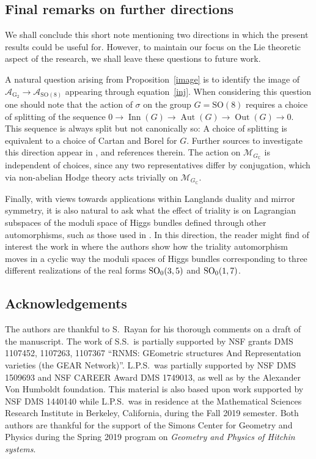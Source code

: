 \documentclass[pdftex]{sigma}
\numberwithin{equation}{section}
\newcommand{\SO}{{\mathrm{SO}}}
\begin{document}
\subsection{Final remarks on further directions}\label{sec:final}
We shall conclude this short note mentioning two directions in which the present results could be useful for. However, to maintain our focus on the Lie theoretic aspect of the research, we shall leave these questions to future work.

 A natural question arising from Proposition~\ref{image} is to identify the image of $\mathcal{A}_{\mathrm{G}_2} \rightarrow \mathcal{A}_{\SO(8)}$ appearing through equation~\eqref{inj}.
When considering this question one should note that the action of $\sigma$ on the group $G=\SO(8)$ requires a choice of splitting of the sequence $0 \rightarrow \operatorname{Inn}(G) \rightarrow \operatorname{Aut}(G) \rightarrow \operatorname{Out}(G) \rightarrow 0$.
 This sequence is always split but not canonically so: A choice of splitting is equivalent to a choice of Cartan and Borel for $G$. Further sources to investigate this direction appear in \cite{anton, oscar}, and references therein. The action on $\mathcal{M}_{G_\mathbb{C}}$ is independent of choices, since any two representatives differ by conjugation, which via non-abelian Hodge theory acts trivially on $\mathcal{M}_{G_\mathbb{C}}$.

 Finally, with views towards applications within Langlands duality and mirror symmetry, it is also natural to ask what the effect of triality is on Lagrangian subspaces of the moduli space of Higgs bundles defined through other automorphisms, such as those used in \cite{slices,cmc}.
In this direction, the reader might find of interest the work in \cite[Section~10]{oscar} where the authors show how the triality automorphism moves in a cyclic way the moduli spaces of Higgs bundles corresponding to three different realizations of the real forms ${\rm SO}_0(3,5)$ and ${\rm SO}_0(1,7)$.

\subsection*{Acknowledgements}
The authors are thankful to S.~Rayan for his thorough comments on a draft of the manuscript. The work of S.S.\ is partially supported by NSF grants DMS 1107452, 1107263, 1107367 ``RNMS: GEometric structures And Representation varieties (the GEAR Network)''.
 L.P.S.\ was partially supported by NSF DMS 1509693 and NSF CAREER Award DMS 1749013, as well as by the Alexander Von Humboldt foundation. This material is also based upon work supported by NSF DMS 1440140 while L.P.S.\ was in residence at the Mathematical Sciences
Research Institute in Berkeley, California, during the Fall 2019 semester. Both authors are thankful for the support of the Simons Center for Geometry and Physics during the Spring 2019 program on {\it Geometry and Physics of Hitchin systems}.
\end{document}
